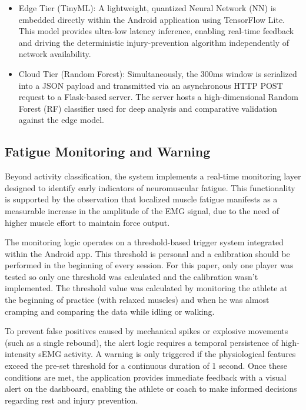 \documentclass[conference]{IEEEtran}
\begin{document}
\begin{itemize}
  \item Edge Tier (TinyML): A lightweight, quantized Neural Network (NN) is embedded directly within the Android application using TensorFlow Lite. This model provides ultra-low latency inference, enabling real-time feedback and driving the deterministic injury-prevention algorithm independently of network availability.
  \item Cloud Tier (Random Forest): Simultaneously, the 300ms window is serialized into a JSON payload and transmitted via an asynchronous HTTP POST request to a Flask-based server. The server hosts a high-dimensional Random Forest (RF) classifier used for deep analysis and comparative validation against the edge model.
\end{itemize}


\subsection{Fatigue Monitoring and Warning}

Beyond activity classification, the system implements a real-time monitoring layer designed to identify early indicators of neuromuscular fatigue. This functionality is supported by the observation that localized 
muscle fatigue manifests as a measurable increase in the amplitude of the EMG signal, due to the need of higher muscle effort to maintain force output.

The monitoring logic operates on a threshold-based trigger system integrated within the Android app. This threshold is personal and a calibration should be performed in the beginning of every session. For this paper, 
only one player was tested so only one threshold was calculated and the calibration wasn't implemented. The threshold value was calculated by monitoring the athlete at the beginning of practice (with relaxed muscles) 
and when he was almost cramping and comparing the data while idling or walking.

To prevent false positives caused by mechanical spikes or explosive movements (such as a single rebound), the alert logic requires a temporal persistence of high-intensity sEMG activity. A warning is only 
triggered if the physiological features exceed the pre-set threshold for a continuous duration of 1 second. Once these conditions are met, the application provides immediate feedback with a visual alert on the 
dashboard, enabling the athlete or coach to make informed decisions regarding rest and injury prevention.
\end{document}
